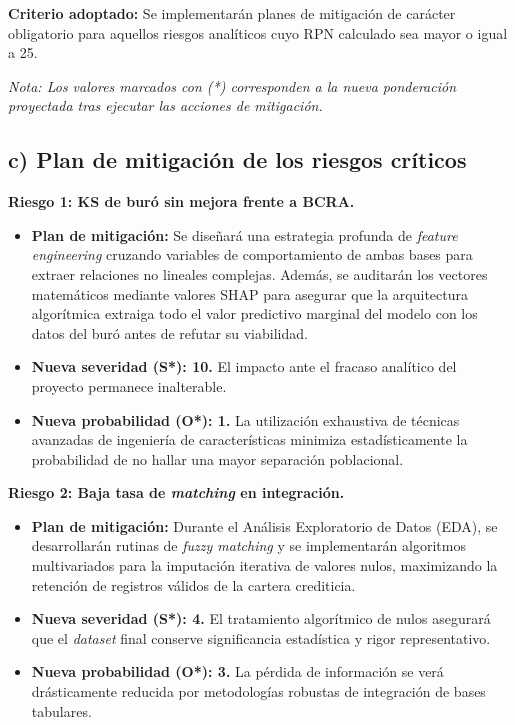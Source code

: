 \documentclass[
11pt, %
]{charter}
\begin{document}
\textbf{Criterio adoptado:} Se implementarán planes de mitigación de carácter obligatorio para aquellos riesgos analíticos cuyo RPN calculado sea mayor o igual a 25. 

\textit{Nota: Los valores marcados con (*) corresponden a la nueva ponderación proyectada tras ejecutar las acciones de mitigación.}

\subsection*{c) Plan de mitigación de los riesgos críticos}

\textbf{Riesgo 1: KS de buró sin mejora frente a BCRA.}
\begin{itemize}
    \item \textbf{Plan de mitigación:} Se diseñará una estrategia profunda de \textit{feature engineering} cruzando variables de comportamiento de ambas bases para extraer relaciones no lineales complejas. Además, se auditarán los vectores matemáticos mediante valores SHAP para asegurar que la arquitectura algorítmica extraiga todo el valor predictivo marginal del modelo con los datos del buró antes de refutar su viabilidad.
    \item \textbf{Nueva severidad (S*): 10.} El impacto ante el fracaso analítico del proyecto permanece inalterable.
    \item \textbf{Nueva probabilidad (O*): 1.} La utilización exhaustiva de técnicas avanzadas de ingeniería de características minimiza estadísticamente la probabilidad de no hallar una mayor separación poblacional.
\end{itemize}

\textbf{Riesgo 2: Baja tasa de \textit{matching} en integración.}
\begin{itemize}
    \item \textbf{Plan de mitigación:} Durante el Análisis Exploratorio de Datos (EDA), se desarrollarán rutinas de \textit{fuzzy matching} y se implementarán algoritmos multivariados para la imputación iterativa de valores nulos, maximizando la retención de registros válidos de la cartera crediticia.
    \item \textbf{Nueva severidad (S*): 4.} El tratamiento algorítmico de nulos asegurará que el \textit{dataset} final conserve significancia estadística y rigor representativo.
    \item \textbf{Nueva probabilidad (O*): 3.} La pérdida de información se verá drásticamente reducida por metodologías robustas de integración de bases tabulares.
\end{itemize}
\end{document}
